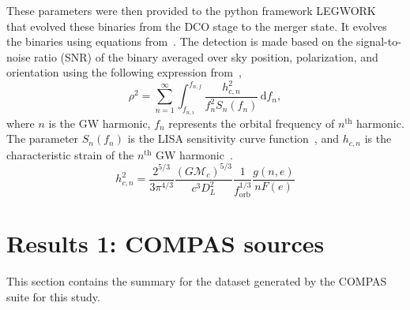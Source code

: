 \documentclass[12pt, journal, onecolumn]{IEEEtran}
\begin{document}
    These parameters were then provided to the python framework LEGWORK~\cite{wagg2021legwork} that evolved these binaries from the DCO stage to the merger state.
    It evolves the binaries using equations from~\cite{Peters1963, Peters1964}.
    The detection is made based on the signal-to-noise ratio (SNR) of the binary averaged over sky position, polarization, and orientation using the following expression from~\cite{Finn2000},
    \begin{equation}
        \rho^2 = \sum_{n=1}^{\infty}\int_{f_{n, i}}^{f_{n, f}}\frac{h_{c, n}^2}{f_n^2 S_n(f_n)}\,\text{d}f_n,
        \label{eq:snr_equation}
    \end{equation}
    where $n$ is the GW harmonic, $f_n$ represents the orbital frequency of $n^\text{th}$ harmonic.
    The parameter $S_n(f_n)$ is the LISA sensitivity curve function~\cite{Robson2019}, and $h_{c, n}$ is the characteristic strain of the $n^\text{th}$ GW harmonic~\cite{Barack2004}.
    \begin{equation}
        h_{c,n}^2 = \frac{2^{5/3}}{3\pi^{4/3}}\frac{(G\mathcal{M}_c)^{5/3}}{c^3 D_L^2}\frac{1}{f_\text{orb}^{1/3}}\frac{g(n, e)}{nF(e)}
        \label{eq:characteristic_strain}
    \end{equation}




    \section{Results 1: COMPAS sources}
    \label{sec:compas_sources}

    This section contains the summary for the dataset generated by the COMPAS suite for this study.
\end{document}
